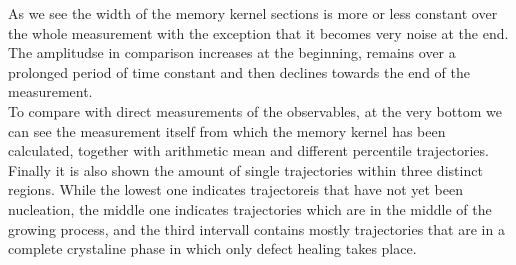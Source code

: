 As we see the width of the memory kernel sections is more or less constant over the whole measurement with the exception that it becomes very noise at the end.\\
The amplitudse in comparison increases at the beginning, remains over a prolonged period of time constant and then declines towards the end of the measurement.\\
To compare with direct measurements of the observables, at the very bottom we can see the measurement itself from which the memory kernel has been calculated, together with arithmetic mean and different percentile trajectories.\\
Finally it is also shown the amount of single trajectories within three distinct regions. While the lowest one indicates trajectoreis that have not yet been nucleation, the middle one indicates trajectories which are in the middle of the growing process, and the third intervall contains mostly trajectories that are in a complete crystaline phase in which only defect healing takes place.\\


